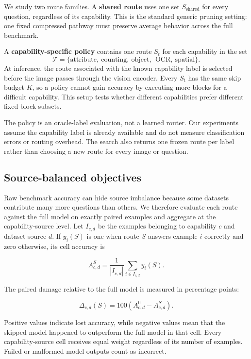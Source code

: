 \documentclass[10pt]{article}
\begin{document}
We study two route families. A \textbf{shared route} uses one set
\(S_{\mathrm{shared}}\) for every question, regardless of its
capability. This is the standard generic pruning setting: one fixed
compressed pathway must preserve average behavior across the full
benchmark.

A \textbf{capability-specific policy} contains one route \(S_t\) for
each capability in the set
\[
\mathcal{T} = \{\text{attribute},\ \text{counting},\ \text{object},\
\ \text{OCR},\ \text{spatial}\}.
\]
At
inference, the route associated with the known capability label is
selected before the image passes through the vision encoder. Every
\(S_t\) has the same skip budget \(K\), so a policy cannot gain accuracy
by executing more blocks for a difficult capability. This setup tests
whether different capabilities prefer different fixed block subsets.

The policy is an oracle-label evaluation, not a learned router. Our
experiments assume the capability label is already available and do not
measure classification errors or routing overhead. The search also
returns one frozen route per label rather than choosing a new route for
every image or question.

\subsection{Source-balanced objectives}\label{source-balanced-objectives}

Raw benchmark accuracy can hide source imbalance because some datasets
contribute many more questions than others. We therefore evaluate each
route against the full model on exactly paired examples and aggregate at
the capability-source level. Let \(I_{c,d}\) be the examples belonging
to capability \(c\) and dataset source \(d\). If \(y_i(S)\) is one when
route \(S\) answers example \(i\) correctly and zero otherwise, its cell
accuracy is

\[
A^S_{c,d}=\frac{1}{|I_{c,d}|}\sum_{i\in I_{c,d}} y_i(S).
\]

The paired damage relative to the full model is measured in percentage
points:

\[
\Delta_{c,d}(S)=100\left(A^0_{c,d}-A^S_{c,d}\right).
\]

Positive values indicate lost accuracy, while negative values mean that
the skipped model happened to outperform the full model in that cell.
Every capability-source cell receives equal weight regardless of its
number of examples. Failed or malformed model outputs count as
incorrect.
\end{document}
